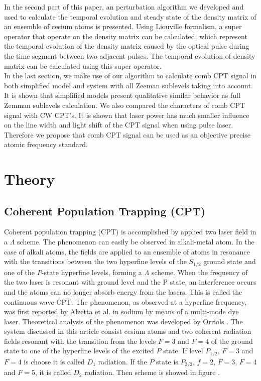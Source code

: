 \documentclass[11pt,a4paper]{article}
\begin{document}
In the second part of this paper, an perturbation algorithm we developed and used to calculate the temporal evolution and steady state of the density matrix of an ensemble of cesium atoms is presented. Using Liouville formalism, a super operator that operate on the density matrix can be calculated, which represent the temporal evolution of the density matrix caused by the optical pulse during the time segment between two adjacent pulses. The temporal evolution of density matrix can be calculated using this super operator.\\

In the last section, we make use of our algorithm to calculate comb CPT signal in both simplified model and system with all Zeeman sublevels taking into account. It is shown that simplified models present qualitative similar behavior as full Zemman sublevels calculation. We also compared the characters of comb CPT signal with CW CPT's. It is shown that laser power has much smaller influence on the line width and light shift of the CPT signal when using pulse laser. Therefore we propose that comb CPT signal can be used as an objective precise atomic frequency standard.\\


\section{Theory}
\subsection{Coherent Population Trapping (CPT)}
Coherent population trapping (CPT) is accomplished by applied two laser field in a $\Lambda$ scheme. The phenomenon can easily be observed in  alkali-metal atom. In the case of alkali atoms, the fields are applied to an ensemble of atoms in resonance with the transitions between the two hyperfine levels of the $S_{1/2}$ ground state and one of the $P$-state hyperfine levels, forming a $\Lambda$ scheme. When the frequency of the two laser is resonant with ground level and the P state, an interference occurs and the atoms can no longer absorb energy from the lasers. This is called the continuous wave CPT. The phenomenon, as observed at a hyperfine frequency, was first reported by Alzetta et al. in sodium by means of a multi-mode dye laser\cite{Alzetta1976}. Theoretical analysis of the phenomenon was developed by Orriols \cite{Orriols1979}. The system discussed in this article consist cesium atoms and two coherent radiation fields resonant with the transition from the levels $F=3$ and $F=4$ of the ground state to one of the hyperfine levels of the excited $P$ state. If level $P_{1/2}$, $F=3$ and $F=4$ is choose it is called $D_1$ radiation. If the $P$ state is $P_{3/2}$, $f=2$, $F=3$, $F=4$ and $F=5$, it is called $D_2$ radiation. Then scheme is showed in figure .\\
\end{document}
